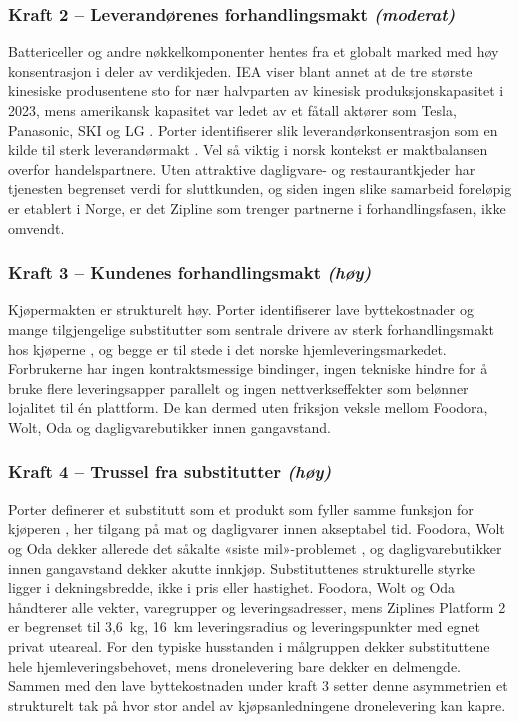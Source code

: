 \subsubsection{Kraft 2 -- Leverandørenes forhandlingsmakt
\normalfont\textit{(moderat)}}

Battericeller og andre nøkkelkomponenter hentes fra et globalt marked med høy
konsentrasjon i deler av verdikjeden. IEA viser blant annet at de tre største
kinesiske produsentene sto for nær halvparten av kinesisk produksjonskapasitet
i 2023, mens amerikansk kapasitet var ledet av et fåtall aktører som Tesla,
Panasonic, SKI og LG \parencite{iea2024_batteries}. Porter identifiserer slik
leverandørkonsentrasjon som en kilde til sterk leverandørmakt
\parencite[27]{porter1980}. Vel så viktig i norsk kontekst er maktbalansen
overfor handelspartnere. Uten attraktive dagligvare- og restaurantkjeder har
tjenesten begrenset verdi for sluttkunden, og siden ingen slike samarbeid
foreløpig er etablert i Norge, er det Zipline som trenger partnerne i
forhandlingsfasen, ikke omvendt.

\subsubsection{Kraft 3 -- Kundenes forhandlingsmakt \normalfont\textit{(høy)}}

Kjøpermakten er strukturelt høy. Porter identifiserer lave byttekostnader og
mange tilgjengelige substitutter som sentrale drivere av sterk
forhandlingsmakt hos kjøperne \parencite[24]{porter1980}, og begge er til
stede i det norske hjemleveringsmarkedet. Forbrukerne har ingen
kontraktsmessige bindinger, ingen tekniske hindre for å bruke flere
leveringsapper parallelt og ingen nettverkseffekter som belønner lojalitet
til én plattform. De kan dermed uten friksjon veksle mellom Foodora, Wolt,
Oda og dagligvarebutikker innen gangavstand.

\subsubsection{Kraft 4 -- Trussel fra substitutter \normalfont\textit{(høy)}}
Porter definerer et substitutt som et produkt som fyller samme funksjon for
kjøperen \parencite[23]{porter1980}, her tilgang på mat og dagligvarer innen
akseptabel tid. Foodora, Wolt og Oda dekker allerede det såkalte
«siste mil»-problemet \parencite{gevaers2011}, og dagligvarebutikker innen
gangavstand dekker akutte innkjøp. Substituttenes strukturelle styrke ligger
i dekningsbredde, ikke i pris eller hastighet. Foodora, Wolt og Oda håndterer
alle vekter, varegrupper og leveringsadresser, mens Ziplines Platform 2 er
begrenset til 3,6~kg, 16~km leveringsradius og leveringspunkter med egnet
privat uteareal. For den typiske husstanden i målgruppen dekker substituttene
hele hjemleveringsbehovet, mens dronelevering bare dekker en delmengde.
Sammen med den lave byttekostnaden under kraft 3 setter denne asymmetrien et
strukturelt tak på hvor stor andel av kjøpsanledningene dronelevering kan
kapre.

